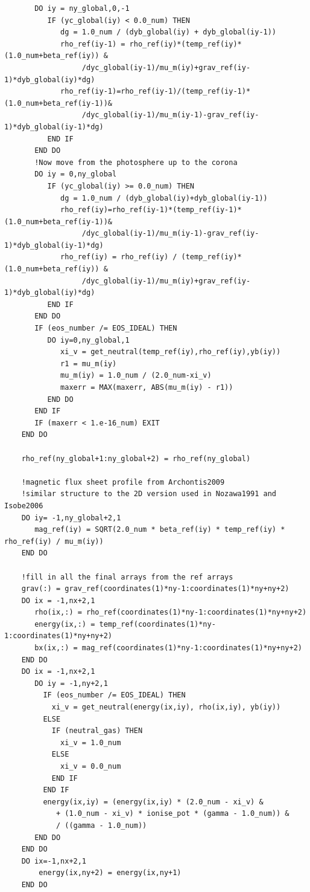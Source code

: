 \documentclass[11pt]{article}
\begin{document}
\begin{verbatim}
       DO iy = ny_global,0,-1
          IF (yc_global(iy) < 0.0_num) THEN  
             dg = 1.0_num / (dyb_global(iy) + dyb_global(iy-1))
             rho_ref(iy-1) = rho_ref(iy)*(temp_ref(iy)*(1.0_num+beta_ref(iy)) &
                  /dyc_global(iy-1)/mu_m(iy)+grav_ref(iy-1)*dyb_global(iy)*dg)
             rho_ref(iy-1)=rho_ref(iy-1)/(temp_ref(iy-1)*(1.0_num+beta_ref(iy-1))&
                  /dyc_global(iy-1)/mu_m(iy-1)-grav_ref(iy-1)*dyb_global(iy-1)*dg)
          END IF
       END DO
       !Now move from the photosphere up to the corona
       DO iy = 0,ny_global
          IF (yc_global(iy) >= 0.0_num) THEN
             dg = 1.0_num / (dyb_global(iy)+dyb_global(iy-1))
             rho_ref(iy)=rho_ref(iy-1)*(temp_ref(iy-1)*(1.0_num+beta_ref(iy-1))&
                  /dyc_global(iy-1)/mu_m(iy-1)-grav_ref(iy-1)*dyb_global(iy-1)*dg)
             rho_ref(iy) = rho_ref(iy) / (temp_ref(iy)*(1.0_num+beta_ref(iy)) &
                  /dyc_global(iy-1)/mu_m(iy)+grav_ref(iy-1)*dyb_global(iy)*dg)
          END IF
       END DO
       IF (eos_number /= EOS_IDEAL) THEN
          DO iy=0,ny_global,1
             xi_v = get_neutral(temp_ref(iy),rho_ref(iy),yb(iy))
             r1 = mu_m(iy)
             mu_m(iy) = 1.0_num / (2.0_num-xi_v)
             maxerr = MAX(maxerr, ABS(mu_m(iy) - r1))
          END DO
       END IF
       IF (maxerr < 1.e-16_num) EXIT
    END DO 

    rho_ref(ny_global+1:ny_global+2) = rho_ref(ny_global)

    !magnetic flux sheet profile from Archontis2009
    !similar structure to the 2D version used in Nozawa1991 and Isobe2006
    DO iy= -1,ny_global+2,1
       mag_ref(iy) = SQRT(2.0_num * beta_ref(iy) * temp_ref(iy) * rho_ref(iy) / mu_m(iy))
    END DO

    !fill in all the final arrays from the ref arrays
    grav(:) = grav_ref(coordinates(1)*ny-1:coordinates(1)*ny+ny+2)
    DO ix = -1,nx+2,1
       rho(ix,:) = rho_ref(coordinates(1)*ny-1:coordinates(1)*ny+ny+2)
       energy(ix,:) = temp_ref(coordinates(1)*ny-1:coordinates(1)*ny+ny+2)
       bx(ix,:) = mag_ref(coordinates(1)*ny-1:coordinates(1)*ny+ny+2)
    END DO
    DO ix = -1,nx+2,1
       DO iy = -1,ny+2,1 
         IF (eos_number /= EOS_IDEAL) THEN         
           xi_v = get_neutral(energy(ix,iy), rho(ix,iy), yb(iy))
         ELSE  
           IF (neutral_gas) THEN
             xi_v = 1.0_num
           ELSE
             xi_v = 0.0_num
           END IF
         END IF   
         energy(ix,iy) = (energy(ix,iy) * (2.0_num - xi_v) &
            + (1.0_num - xi_v) * ionise_pot * (gamma - 1.0_num)) &
            / ((gamma - 1.0_num))
       END DO
    END DO
    DO ix=-1,nx+2,1
        energy(ix,ny+2) = energy(ix,ny+1)
    END DO


\end{verbatim}
\end{document}
